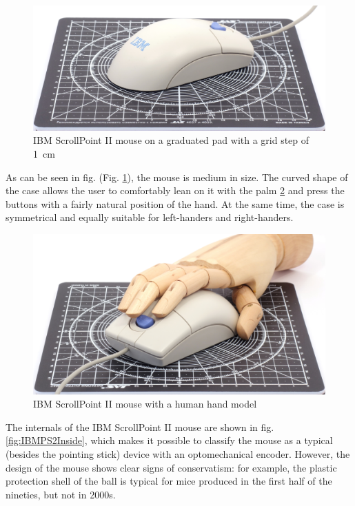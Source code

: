 \documentclass[11pt, a4paper]{article}
\begin{document}
\begin{figure}[h]
    \centering
    \includegraphics[scale=0.54]{2000_ibm_scrollpoint_ii_mouse/size_30.jpg}
    \caption{IBM ScrollPoint II mouse on a graduated pad with a grid step of 1~cm}
    \label{fig:IBMPS2Size}
\end{figure}

As can be seen in fig. (Fig. \ref{fig:IBMPS2Size}), the mouse is medium in size. The curved shape of the case allows the user to comfortably lean on it with the palm \ref{fig:IBMScrollPointIIHand} and press the buttons with a fairly natural position of the hand. At the same time, the case is symmetrical and equally suitable for left-handers and right-handers.


\begin{figure}[h]
    \centering
    \includegraphics[scale=0.6]{2000_ibm_scrollpoint_ii_mouse/hand_30.jpg}
    \caption{IBM ScrollPoint II mouse with a human hand model}
    \label{fig:IBMScrollPointIIHand}
\end{figure}

The internals of the IBM ScrollPoint II mouse are shown in fig. \ref{fig:IBMPS2Inside}, which makes it possible to classify the mouse as a typical (besides the pointing stick) device with an optomechanical encoder. However, the design of the mouse shows clear signs of conservatism: for example, the plastic protection shell of the ball is typical for mice produced in the first half of the nineties, but not in 2000s.
\end{document}
